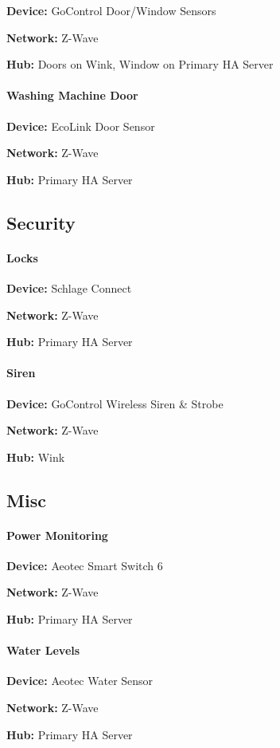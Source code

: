 \documentclass[]{article}
\let\oldparagraph\paragraph
\renewcommand{\paragraph}[1]{\oldparagraph{#1}\mbox{}}
\begin{document}
\textbf{Device: }
{GoControl Door/Window Sensors}

\textbf{Network: }
{Z-Wave}

\textbf{Hub: }
{Doors on Wink, Window on Primary HA Server}

\paragraph{\texorpdfstring{{Washing Machine Door}}{Washing Machine Door}}

\textbf{Device: }
{EcoLink Door Sensor}

\textbf{Network: }
{Z-Wave}

\textbf{Hub: }
{Primary HA Server}

\subsection{\texorpdfstring{{Security}}{Security}}

\paragraph{\texorpdfstring{{Locks}}{Locks}}

\textbf{Device: }
{Schlage Connect}

\textbf{Network: }
{Z-Wave}

\textbf{Hub: }
{Primary HA Server}

\paragraph{\texorpdfstring{{Siren}}{Siren}}

\textbf{Device: }
{GoControl Wireless Siren \& Strobe}

\textbf{Network: }
{Z-Wave}

\textbf{Hub: }
{Wink}

\subsection{\texorpdfstring{{Misc}}{Misc}}

\paragraph{\texorpdfstring{{Power Monitoring}}{Power Monitoring}}

\textbf{Device: }
{Aeotec Smart Switch 6}

\textbf{Network: }
{Z-Wave}

\textbf{Hub: }
{Primary HA Server}

\paragraph{\texorpdfstring{{Water Levels}}{Water Levels}}

\textbf{Device: }
{Aeotec Water Sensor}

\textbf{Network: }
{Z-Wave}

\textbf{Hub: }
{Primary HA Server}
\end{document}
